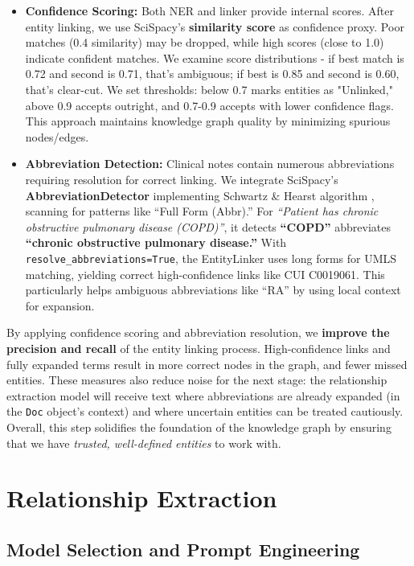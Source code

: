 \begin{itemize}
\item \textbf{Confidence Scoring:} Both NER and linker provide internal scores. After entity linking, we use SciSpacy's \textbf{similarity score} as confidence proxy. Poor matches (0.4 similarity) may be dropped, while high scores (close to 1.0) indicate confident matches. We examine score distributions - if best match is 0.72 and second is 0.71, that's ambiguous; if best is 0.85 and second is 0.60, that's clear-cut. We set thresholds: below 0.7 marks entities as "Unlinked," above 0.9 accepts outright, and 0.7-0.9 accepts with lower confidence flags. This approach maintains knowledge graph quality by minimizing spurious nodes/edges.

\item \textbf{Abbreviation Detection:} Clinical notes contain numerous abbreviations requiring resolution for correct linking. We integrate SciSpacy's \textbf{AbbreviationDetector} implementing Schwartz \& Hearst algorithm \parencite{Schwartz2003}, scanning for patterns like ``Full Form (Abbr).'' For \textit{``Patient has chronic obstructive pulmonary disease (COPD)''}, it detects \textbf{``COPD''} abbreviates \textbf{``chronic obstructive pulmonary disease.''} With \texttt{resolve\_abbreviations=True}, the EntityLinker uses long forms for UMLS matching, yielding correct high-confidence links like CUI C0019061. This particularly helps ambiguous abbreviations like ``RA'' by using local context for expansion.
\end{itemize}

By applying confidence scoring and abbreviation resolution, we \textbf{improve the precision and recall} of the entity linking process. High-confidence links and fully expanded terms result in more correct nodes in the graph, and fewer missed entities. These measures also reduce noise for the next stage: the relationship extraction model will receive text where abbreviations are already expanded (in the \texttt{Doc} object's context) and where uncertain entities can be treated cautiously. Overall, this step solidifies the foundation of the knowledge graph by ensuring that we have \textit{trusted, well-defined entities} to work with.

\section{Relationship Extraction}
\label{sec:relationextraction}

\subsection{Model Selection and Prompt Engineering}

